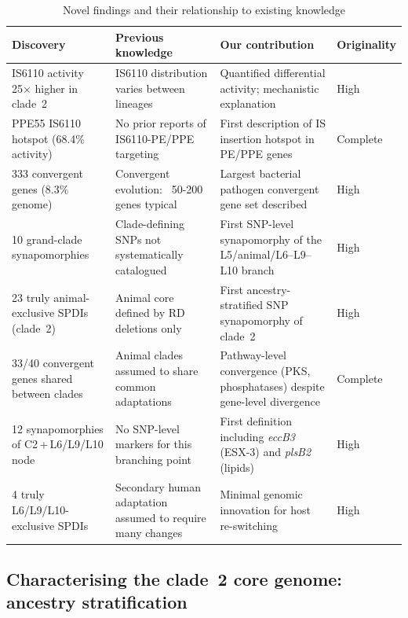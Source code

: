 \documentclass[11pt,a4paper]{article}
\begin{document}
\begin{table}[h]
\centering
\caption{Novel findings and their relationship to existing knowledge}
\label{tab:novel_findings}
\begin{tabular}{@{}p{4cm}p{4cm}p{4cm}p{2cm}@{}}
\toprule
\textbf{Discovery} & \textbf{Previous knowledge} & \textbf{Our contribution} & \textbf{Originality} \\
\midrule
IS6110 activity 25× higher in clade~2 & IS6110 distribution varies between lineages \cite{Gonzalo2018} & Quantified differential activity; mechanistic explanation & High \\
PPE55 IS6110 hotspot (68.4\% activity) & No prior reports of IS6110-PE/PPE targeting & First description of IS insertion hotspot in PE/PPE genes & Complete \\
333 convergent genes (8.3\% genome) & Convergent evolution: ~50-200 genes typical \cite{Marvig2015} & Largest bacterial pathogen convergent gene set described & High \\
10 grand-clade synapomorphies & Clade-defining SNPs not systematically catalogued & First SNP-level synapomorphy of the L5/animal/L6--L9--L10 branch & High \\
23 truly animal-exclusive SPDIs (clade~2) & Animal core defined by RD deletions only \cite{Brosch2002} & First ancestry-stratified SNP synapomorphy of clade~2 & High \\
33/40 convergent genes shared between clades & Animal clades assumed to share common adaptations & Pathway-level convergence (PKS, phosphatases) despite gene-level divergence & Complete \\
12 synapomorphies of C2\,+\,L6/L9/L10 node & No SNP-level markers for this branching point & First definition including \textit{eccB3} (ESX-3) and \textit{plsB2} (lipids) & High \\
4 truly L6/L9/L10-exclusive SPDIs & Secondary human adaptation assumed to require many changes & Minimal genomic innovation for host re-switching & High \\
\bottomrule
\end{tabular}
\end{table}

\subsection{Characterising the clade~2 core genome: ancestry stratification}
\label{sec:disc:identity}
\end{document}
